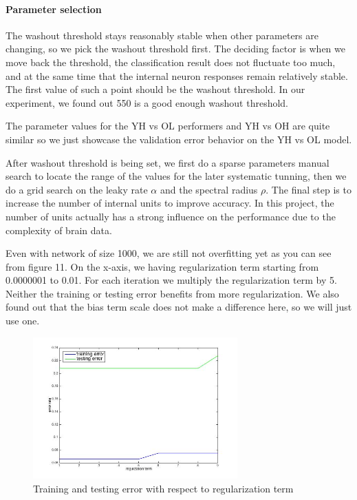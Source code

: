 \documentclass[a4paper,11pt,oneside]{article}
\begin{document}
\paragraph{Parameter selection}
The washout threshold stays reasonably stable when other parameters are changing, so we pick the washout threshold first. The deciding factor is when we move back the threshold, the classification result does not fluctuate too much, and at the same time that the internal neuron responses remain relatively stable. The first value of such a point should be the washout threshold. In our experiment, we found out 550 is a good enough washout threshold.

The parameter values for the YH vs OL performers and YH vs OH are quite similar so we just showcase the validation error behavior on the YH vs OL model. 

After washout threshold is being set, we first do a sparse parameters manual search to locate the range of the values for the later systematic tunning, then we do a grid search on the leaky rate $\alpha$ and the spectral radius $\rho$. The final step is to increase the number of internal units to improve accuracy. In this project, the number of units actually has a strong influence on the performance due to the complexity of brain data.

Even with network of size 1000, we are still not overfitting yet as you can see from figure 11. On the x-axis, we having regularization term starting from 0.0000001 to 0.01. For each iteration we multiply the regularization term by 5. Neither the training or testing error benefits from more regularization. We also found out that the bias term scale does not make a difference here, so we will just use one.
\begin{figure}[h!]
	\centering
	\includegraphics[width=0.7\textwidth]{img/reg}
	\caption{Training and testing error with respect to regularization term}
\end{figure}
\end{document}
